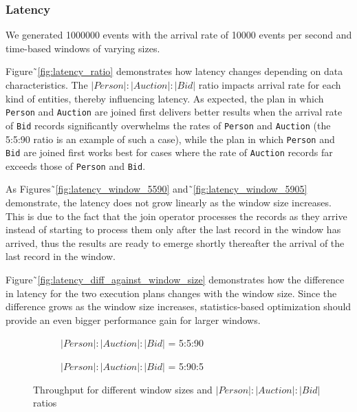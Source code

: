 \subsubsection{Latency}

We generated 1000000 events with the arrival rate of 10000 events per second and time-based windows of varying sizes.

Figure˜\ref{fig:latency_ratio} 
demonstrates how latency changes depending on data characteristics. The $|Person|:|Auction|:|Bid|$ ratio impacts arrival rate for each kind of entities, thereby influencing latency. As expected, the plan in which \texttt{Person} and \texttt{Auction} are joined first delivers better results when the arrival rate of \texttt{Bid} records significantly overwhelms the rates of \texttt{Person} and \texttt{Auction} (the 5:5:90 ratio is an example of such a case), while the plan in which \texttt{Person} and \texttt{Bid} are joined first works best for cases where the rate of \texttt{Auction} records far exceeds those of \texttt{Person} and \texttt{Bid}. 

As Figures˜\ref{fig:latency_window_5590} and˜\ref{fig:latency_window_5905} demonstrate, the latency does not grow linearly as the window size increases. This is due to the fact that the join operator processes the records as they arrive instead of starting to process them only after the last record in the window has arrived, thus the results are ready to emerge shortly thereafter the arrival of the last record in the window.

Figure˜\ref{fig:latency_diff_against_window_size} demonstrates how the difference in latency for the two execution plans changes with the window size. Since the difference grows as the window size increases, statistics-based optimization should provide an even bigger performance gain for larger windows.

\begin{figure}[!ht]
    \centering
    \begin{subfigure}[b]{0.45\textwidth}
            
            \captionsetup{justification=justified}
            \caption{$|Person|:|Auction|:|Bid|$ = 5:5:90}
            \label{fig:throughput_window_5590}
    \end{subfigure}
    \hspace{1.25mm}
    \begin{subfigure}[b]{0.45\textwidth}
            
            \captionsetup{justification=justified}
            \caption{$|Person|:|Auction|:|Bid|$ = 5:90:5}
            \label{fig:throughput_window_5905}
    \end{subfigure}
    \caption{Throughput for different window sizes and $|Person|:|Auction|:|Bid|$ ratios}
    \label{fig:throughput_plots}
\end{figure}

